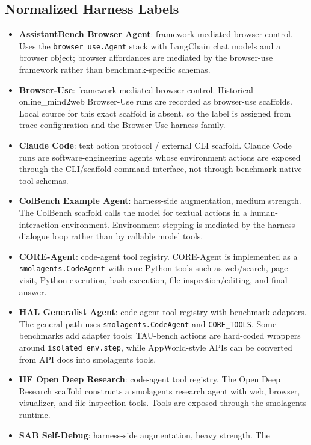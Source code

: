 \subsection{Normalized Harness Labels}

\begingroup
\footnotesize
\begin{itemize}
\item \textbf{AssistantBench Browser Agent}: framework-mediated browser control.
Uses the \texttt{browser\_use.Agent} stack with LangChain chat models and a
browser object; browser affordances are mediated by the browser-use framework
rather than benchmark-specific schemas.
\item \textbf{Browser-Use}: framework-mediated browser control. Historical
online\_mind2web Browser-Use runs are recorded as browser-use scaffolds. Local
source for this exact scaffold is absent, so the label is assigned from trace
configuration and the Browser-Use harness family.
\item \textbf{Claude Code}: text action protocol / external CLI scaffold.
Claude Code runs are software-engineering agents whose environment actions are
exposed through the CLI/scaffold command interface, not through
benchmark-native tool schemas.
\item \textbf{ColBench Example Agent}: harness-side augmentation, medium
strength. The ColBench scaffold calls the model for textual actions in a
human-interaction environment. Environment stepping is mediated by the harness
dialogue loop rather than by callable model tools.
\item \textbf{CORE-Agent}: code-agent tool registry. CORE-Agent is implemented
as a \texttt{smolagents.CodeAgent} with core Python tools such as web/search,
page visit, Python execution, bash execution, file inspection/editing, and
final answer.
\item \textbf{HAL Generalist Agent}: code-agent tool registry with benchmark
adapters. The general path uses \texttt{smolagents.CodeAgent} and
\texttt{CORE\_TOOLS}. Some benchmarks add adapter tools: TAU-bench actions are
hard-coded wrappers around \texttt{isolated\_env.step}, while AppWorld-style
APIs can be converted from API docs into smolagents tools.
\item \textbf{HF Open Deep Research}: code-agent tool registry. The Open Deep
Research scaffold constructs a smolagents research agent with web, browser,
visualizer, and file-inspection tools. Tools are exposed through the smolagents
runtime.
\item \textbf{SAB Self-Debug}: harness-side augmentation, heavy strength. The

\end{itemize}

